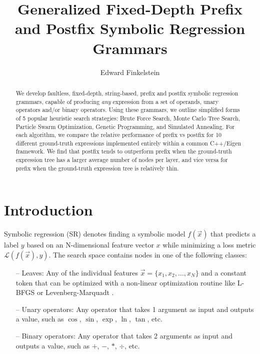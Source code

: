 \documentclass[runningheads]{llncs}
\begin{document}
%
\title{Generalized Fixed-Depth Prefix and Postfix Symbolic Regression Grammars}%
%
%
\author{Edward Finkelstein}%
%
%
%
\maketitle              %
%
\begin{abstract}
We develop faultless, fixed-depth, string-based, prefix and postfix symbolic regression grammars, capable of producing \emph{any} expression from a set of operands, unary operators and/or binary operators. Using these grammars, we outline simplified forms of 5 popular heuristic search strategies: Brute Force Search, Monte Carlo Tree Search, Particle Swarm Optimization, Genetic Programming, and Simulated Annealing. For each algorithm, we compare the relative performance of prefix vs postfix for 10 different ground-truth expressions implemented entirely within a common C++/Eigen framework. We find that postfix tends to outperform prefix when the ground-truth expression tree has a larger average number of nodes per layer, and vice versa for prefix when the ground-truth expression tree is relatively thin.

\end{abstract}

\section{Introduction}
Symbolic regression (SR) denotes finding a symbolic model $f\left(\vec{x}\right)$ that predicts a label $y$ based on an N-dimensional feature vector $x$ while minimizing a loss metric $\mathcal{L}\left(f\left(\vec{x}\right),y\right)$. The search space contains nodes in one of the following classes:
\begin{itemize}
\item[--] Leaves: Any of the individual features $\vec{x} = \{x_1, x_2, \ldots,x_{N}\}$ and a constant token that can be optimized with a non-linear optimization routine like L-BFGS \cite{doi:10.1137/0916069} or Levenberg-Marquadt \cite{83b09f23-b20e-3617-8f72-24765b713f7b} \cite{doi:10.1137/0111030}.
\item[--] Unary operators: Any operator that takes 1 argument as input and outputs a value, such as $\cos$, $\sin$, $\exp$, $\ln$, $\tan$, etc.
\item[--] Binary operators: Any operator that takes 2 arguments as input and outputs a value, such as $+$, $-$, $*$, $\div$, etc.
\end{itemize}
\end{document}
